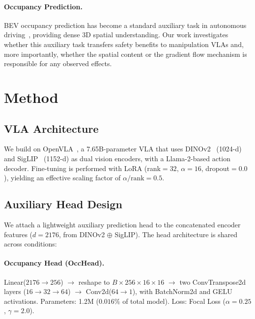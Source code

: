 \documentclass[letterpaper]{article}
\begin{document}
\paragraph{Occupancy Prediction.}
BEV occupancy prediction has become a standard auxiliary task in autonomous driving~\citep{tong2023scene,wei2023surroundocc,tian2024occ3d}, providing dense 3D spatial understanding.
Our work investigates whether this auxiliary task transfers safety benefits to manipulation VLAs and, more importantly, whether the spatial content or the gradient flow mechanism is responsible for any observed effects.


\section{Method}
\label{sec:method}

\subsection{VLA Architecture}

We build on OpenVLA~\citep{kim2024openvla}, a 7.65B-parameter VLA that uses DINOv2~\citep{oquab2024dinov2} (1024-d) and SigLIP~\citep{zhai2023siglip} (1152-d) as dual vision encoders, with a Llama-2-based action decoder.
Fine-tuning is performed with LoRA (rank$=32$, $\alpha=16$, dropout$=0.0$), yielding an effective scaling factor of $\alpha/\text{rank}=0.5$.

\subsection{Auxiliary Head Design}

We attach a lightweight auxiliary prediction head to the concatenated encoder features ($d=2176$, from DINOv2 $\oplus$ SigLIP).
The head architecture is shared across conditions:

\paragraph{Occupancy Head (OccHead).}
Linear($2176 \to 256$) $\to$ reshape to $B \times 256 \times 16 \times 16$ $\to$ two ConvTranspose2d layers ($16 \to 32 \to 64$) $\to$ Conv2d($64 \to 1$), with BatchNorm2d and GELU activations.
Parameters: 1.2M ($0.016\%$ of total model).
Loss: Focal Loss ($\alpha=0.25$, $\gamma=2.0$).
\end{document}
